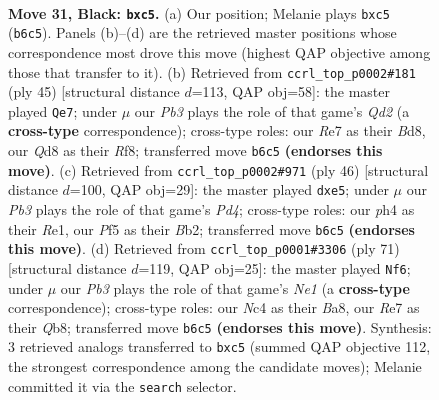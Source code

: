 \documentclass[11pt]{article}
\begin{document}
\clearpage

\begin{figure}[p]\centering
\begin{subfigure}{0.46\textwidth}\centering
\resizebox{\linewidth}{!}{%
\newchessgame
\chessboard[
  setfen={r1bq2k1/3pr1bp/pp2p3/2P2p1B/P1nP1Q1P/2N2N2/1P3PK1/R1BR4 b - - 1 31},
  showmover=false,
  pgfstyle=straightmove, color=movearrow, markmove={b6-c5}
]}
\caption{}
\end{subfigure}\hfill
\begin{subfigure}{0.46\textwidth}\centering
\resizebox{\linewidth}{!}{%
\newchessgame
\chessboard[
  setfen={3b1rk1/1b1q1ppp/3p2n1/rp2p3/4P1N1/PB1PB2P/R4PP1/3QR1K1 b - - 3 23},
  showmover=false,
  pgfstyle=straightmove, color=movearrow, markmove={d7-e7}
]}
\caption{}
\end{subfigure}
\\[4pt]
\begin{subfigure}{0.46\textwidth}\centering
\resizebox{\linewidth}{!}{%
\newchessgame
\chessboard[
  setfen={brq1rbk1/5p2/p5pp/1pp1n2n/3PP3/P1P4P/BBQN1PP1/3RR1K1 w - - 0 24},
  showmover=false,
  pgfstyle=straightmove, color=movearrow, markmove={d4-e5}
]}
\caption{}
\end{subfigure}\hfill
\begin{subfigure}{0.46\textwidth}\centering
\resizebox{\linewidth}{!}{%
\newchessgame
\chessboard[
  setfen={bqr1nbk1/5pp1/rp1pp3/1N2n2p/P1PBP3/1Q2NPP1/2BR2KP/5R2 b - - 9 36},
  showmover=false,
  pgfstyle=straightmove, color=movearrow, markmove={e8-f6}
]}
\caption{}
\end{subfigure}
\caption{\textbf{Move 31, Black: \texttt{bxc5}.} (a) Our position; Melanie plays \texttt{bxc5} (\texttt{b6c5}). Panels (b)--(d) are the retrieved master positions whose correspondence most drove this move (highest QAP objective among those that transfer to it). (b) Retrieved from \texttt{ccrl\_top\_p0002\#181} (ply 45) [structural distance $d$=113, QAP obj=58]: the master played \texttt{Qe7}; under $\mu$ our \emph{Pb3} plays the role of that game's \emph{Qd2} (a \textbf{cross-type} correspondence); cross-type roles: our \emph{R}e7 as their \emph{B}d8, our \emph{Q}d8 as their \emph{R}f8; transferred move \texttt{b6c5} \textbf{(endorses this move)}. (c) Retrieved from \texttt{ccrl\_top\_p0002\#971} (ply 46) [structural distance $d$=100, QAP obj=29]: the master played \texttt{dxe5}; under $\mu$ our \emph{Pb3} plays the role of that game's \emph{Pd4}; cross-type roles: our \emph{p}h4 as their \emph{R}e1, our \emph{P}f5 as their \emph{B}b2; transferred move \texttt{b6c5} \textbf{(endorses this move)}. (d) Retrieved from \texttt{ccrl\_top\_p0001\#3306} (ply 71) [structural distance $d$=119, QAP obj=25]: the master played \texttt{Nf6}; under $\mu$ our \emph{Pb3} plays the role of that game's \emph{Ne1} (a \textbf{cross-type} correspondence); cross-type roles: our \emph{N}c4 as their \emph{B}a8, our \emph{R}e7 as their \emph{Q}b8; transferred move \texttt{b6c5} \textbf{(endorses this move)}. Synthesis: 3 retrieved analogs transferred to \texttt{bxc5} (summed QAP objective 112, the strongest correspondence among the candidate moves); Melanie committed it via the \texttt{search} selector.}
\label{fig:thought-m61}
\end{figure}
\end{document}

